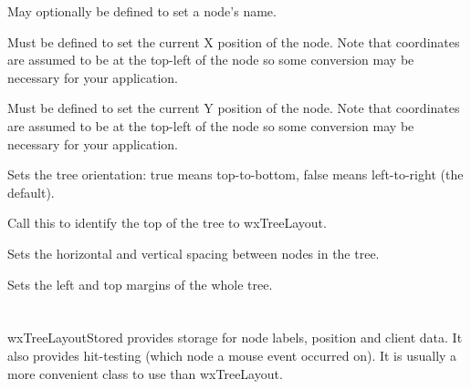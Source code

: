 

May optionally be defined to set a node's name.



Must be defined to set the current X position of the node. Note that
coordinates are assumed to be at the top-left of the node so some conversion
may be necessary for your application.



Must be defined to set the current Y position of the node. Note that
coordinates are assumed to be at the top-left of the node so some conversion
may be necessary for your application.



Sets the tree orientation: true means top-to-bottom, false means left-to-right (the default).

\label{wxtreelayoutsettopnode}


Call this to identify the top of the tree to wxTreeLayout.



Sets the horizontal and vertical spacing between nodes in the tree.

\label{wxtreelayoutsetmargins}


Sets the left and top margins of the whole tree.

\section{}\label{wxtreelayoutstored}

wxTreeLayoutStored provides storage for node labels, position and client data. It also provides hit-testing
(which node a mouse event occurred on). It is usually a more convenient class to use than wxTreeLayout.

